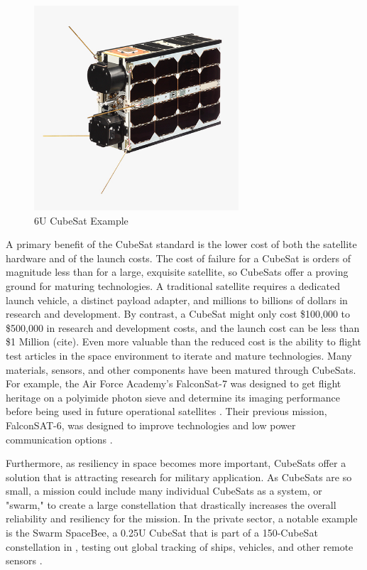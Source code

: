 \begin{figure}[!h]
    \centering
    \includegraphics[width=3in]{Thesis/Literature_Review/Lit Review Figures/6Ucubesatbus.jpg}
    \caption{6U CubeSat Example}
    \label{fig:6U CubeSat Example}
\end{figure}

A primary benefit of the CubeSat standard is the lower cost of both the satellite hardware and of the launch costs. The cost of failure for a CubeSat is orders of magnitude less than for a large, exquisite satellite, so CubeSats offer a proving ground for maturing technologies. A traditional satellite requires a dedicated launch vehicle, a distinct payload adapter, and millions to billions of dollars in research and development. By contrast, a CubeSat might only cost \$100,000 to \$500,000 in research and development costs, and the launch cost can be less than \$1 Million (cite). Even more valuable than the reduced cost is the ability to flight test articles in the space environment to iterate and mature technologies. Many materials, sensors, and other components have been matured through CubeSats. For example, the Air Force Academy's FalconSat-7 was designed to get flight heritage on a polyimide photon sieve and determine its imaging performance before being used in future operational satellites \citep{FalconSat7}. Their previous mission, FalconSAT-6, was designed to improve  technologies and low power communication options \citep{FalconSat6}. 

Furthermore, as resiliency in space becomes more important, CubeSats offer a solution that is attracting research for military application. As CubeSats are so small, a mission could include many individual CubeSats as a system, or "swarm," to create a large constellation that drastically increases the overall reliability and resiliency for the mission. In the private sector, a notable example is the Swarm SpaceBee, a 0.25U CubeSat that is part of a 150-CubeSat constellation in , testing out global  tracking of ships, vehicles, and other remote sensors \citep{Harris2019}. 

